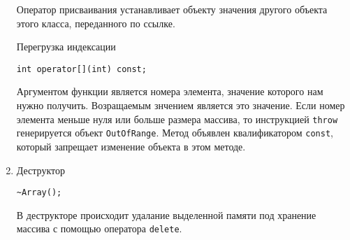 \documentclass[12pt,a4paper]{report}
\begin{document}
\begin{enumerate}
	Оператор присваивания устанавливает объекту значения другого объекта этого класса, переданного по ссылке.
	
	Перегрузка индексации
	
	\verb+int operator[](int) const;+
	
	Аргументом функции является номера элемента, значение которого нам нужно получить. Возращаемым знчением является это значение. Если номер элемента меньше нуля или больше размера массива, то инструкцией \verb+throw+ генерируется объект \verb+OutOfRange+. Метод объявлен квалификатором \verb+const+, который запрещает изменение объекта в этом методе.
	
	\item Деструктор	
	
	\verb+~Array();+
	
	В деструкторе происходит удалание выделенной памяти под хранение массива с помощью оператора \verb+delete+.
	
\end{enumerate}
\end{document}
